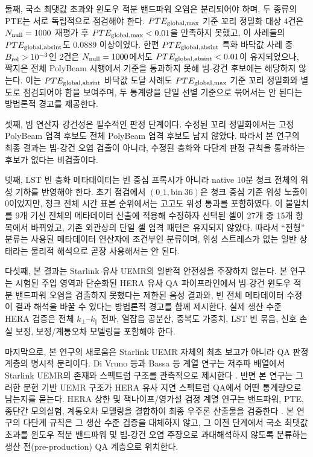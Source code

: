 \documentclass[final,5p,times]{elsarticle}
\newcommand{\NTailRefinedCases}{4}
\newcommand{\NAbsintFloorAboveGate}{2}
\begin{document}
둘째, 국소 최댓값 초과와 윈도우 적분 밴드파워 오염은 분리되어야 하며, 두 종류의 PTE는 서로 독립적으로 점검해야
한다. $PTE_{\rm global,max}$ 기준 꼬리 정밀화 대상 \NTailRefinedCases{}건은 $N_{\rm null}=1000$ 재평가 후
$PTE_{\rm global,max}<0.01$을 만족하지 못했고, 이 사례들의 $PTE_{\rm global,absint}$도 0.0889 이상이었다.
한편 $PTE_{\rm global,absint}$ 특화 바닥값 사례 중 $B_{\rm rel}>10^{-3}$인 \NAbsintFloorAboveGate{}건은
$N_{\rm null}=1000$에서도 $PTE_{\rm global,absint}<0.01$이 유지되었으나, 짝지은 전체 PolyBeam 시행에서
기준을 통과하지 못해 빔-강건 후보에는 해당하지 않는다. 이는 $PTE_{\rm global,absint}$ 바닥값 도달 사례도
$PTE_{\rm global,max}$ 기준 꼬리 정밀화와 별도로 점검되어야 함을 보여주며, 두 통계량을 단일 선별 기준으로
묶어서는 안 된다는 방법론적 경고를 제공한다.

셋째, 빔 연산자 강건성은 필수적인 판정 단계이다. 수정된 꼬리 정밀화에서는 고정 PolyBeam 엄격
후보도 전체 PolyBeam 엄격 후보도 남지 않았다. 따라서 본 연구의 최종 결과는 빔-강건 오염 검출이
아니라, 수정된 층화와 다단계 판정 규칙을 통과하는 후보가 없다는 비검출이다.

넷째, LST 빈 층화 메타데이터는 빈 중심 프록시가 아니라 native 10분 청크 전체의 위성 기하를
반영해야 한다. 초기 점검에서 $(0\_1,\mathrm{bin}\ 36)$은 청크 중심 기준 위성 노출이 0이었지만,
청크 전체 시간 표본 순위에서는 고고도 위성 통과를 포함하였다. 이 불일치를 9개 기선 전체의
메타데이터 산출에 적용해 수정하자 선택된 셀이 27개 중 15개 항목에서 바뀌었고, 기존 외관상의
단일 셀 엄격 패턴은 유지되지 않았다. 따라서 ``전형'' 분류는 사용된 메타데이터 연산자에 조건부인 분류이며,
위성 스트레스가 없는 일반 상태라는 물리적 해석으로 곧장 사용해서는 안 된다.

다섯째, 본 결과는 Starlink 유사 UEMR의 일반적 안전성을 주장하지 않는다. 본 연구는 시험된 주입 영역과
단순화된 HERA 유사 QA 파이프라인에서 빔-강건 윈도우 적분 밴드파워 오염을 검출하지 못했다는
제한된 음성 결과와, 빈 전체 메타데이터 수정이 결과 해석을 바꿀 수 있다는 방법론적 경고를 함께 제시한다.
실제 생산 수준 HERA 검증은 전체 $k_\perp$--$k_\parallel$ 전파,
열잡음 공분산, 중복도 가중치, LST 빈 묶음, 신호 손실 보정, 보정/계통오차
모델링을 포함해야 한다.

마지막으로, 본 연구의 새로움은 Starlink UEMR 자체의 최초 보고가 아니라 QA 판정 계층의 명시적 분리이다.
Di Vruno 등과 Bassa 등 계열 연구는 저주파 배열에서 Starlink UEMR의 존재와 스펙트럼 구조를 관측적으로 제시한다
\citep{divruno2023,bassa2024}. 반면 본 연구는 그러한 문헌 기반 UEMR 구조가 HERA 유사 지연 스펙트럼 QA에서
어떤 통계량으로 남는지를 묻는다. HERA 상한 및 잭나이프/영가설 검정 계열 연구는 밴드파워, PTE, 종단간 모의실험,
계통오차 모델링을 결합하여 최종 우주론 산출물을 검증한다 \citep{abdurashidova2022,wilensky2019}. 본 연구의
다단계 규칙은 그 생산 수준 검증을 대체하지 않고, 그 이전 단계에서 국소 최댓값 초과를 윈도우 적분 밴드파워 및
빔-강건 오염 주장으로 과대해석하지 않도록 분류하는 생산 전(pre-production) QA 계층으로 위치한다.
\end{document}
